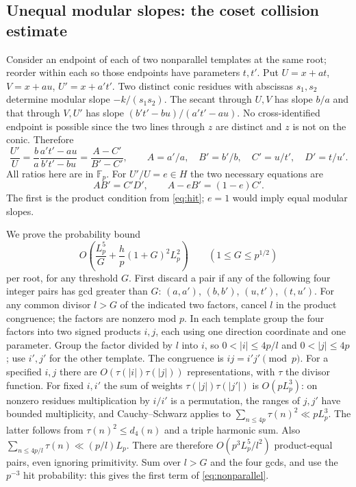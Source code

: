 \documentclass[11pt]{article}
\newcommand{\F}{\mathbb F_p}\newcommand{\G}{\mathcal G}\newcommand{\D}{\mathcal D}\newcommand{\R}{\mathcal R}\newcommand{\Z}{\mathbb Z}\newcommand{\htf}{F_{\mathrm{ht}}}\newcommand{\norm}[1]{\lVert#1\rVert_\infty}\newcommand{\Prob}{\mathbb P}\newcommand{\ch}{\chi}\newcommand{\TT}{\mathcal T}
\begin{document}
\subsection{Unequal modular slopes: the coset collision estimate}
Consider an endpoint of each of two nonparallel templates at the same root; reorder within each so those endpoints have parameters $t,t'$. Put $U=x+at$, $V=x+au$, $U'=x+a't'$. Two distinct conic residues with abscissas $s_1,s_2$ determine modular slope $-k/(s_1s_2)$. The secant through $U,V$ has slope $b/a$ and that through $V,U'$ has slope $(b't'-bu)/(a't'-au)$. No cross-identified endpoint is possible since the two lines through $z$ are distinct and $z$ is not on the conic. Therefore
\[
 \frac{U'}{U}=\frac{b}{a}\frac{a't'-au}{b't'-bu}=\frac{A-C'}{B'-C'},\qquad
 A=a'/a,\quad B'=b'/b,\quad C'=u/t',\quad D'=t/u'.
\]
All ratios here are in $\F$. For $U'/U=e\in H$ the two necessary equations are
\begin{equation}\label{eq:ABCD}
 AB'=C'D',\qquad A-e B'=(1-e)C'.
\end{equation}
The first is the product condition from \eqref{eq:hit}; $e=1$ would imply equal modular slopes.

We prove the probability bound
\begin{equation}\label{eq:nonparallel}
 O\left(\frac{L_p^5}{G}+\frac{h}{p}(1+G)^2 L_p^2\right) \qquad(1\le G\le p^{1/2})
\end{equation}
per root, for any threshold $G$. First discard a pair if any of the following four integer pairs has gcd greater than $G$: $(a,a')$, $(b,b')$, $(u,t')$, $(t,u')$. For any common divisor $l>G$ of the indicated two factors, cancel $l$ in the product congruence; the factors are nonzero mod $p$. In each template group the four factors into two signed products $i,j$, each using one direction coordinate and one parameter. Group the factor divided by $l$ into $i$, so $0<|i|\le4p/l$ and $0<|j|\le4p$; use $i',j'$ for the other template. The congruence is $ij=i'j'\pmod p$. For a specified $i,j$ there are $O(\tau(|i|)\tau(|j|))$ representations, with $\tau$ the divisor function. For fixed $i,i'$ the sum of weights $\tau(|j|)\tau(|j'|)$ is $O(pL_p^3)$: on nonzero residues multiplication by $i/i'$ is a permutation, the ranges of $j,j'$ have bounded multiplicity, and Cauchy--Schwarz applies to $\sum_{n\le4p}\tau(n)^2\ll p L_p^3$. The latter follows from $\tau(n)^2\le d_4(n)$ and a triple harmonic sum. Also $\sum_{n\le4p/l}\tau(n)\ll(p/l)L_p$. There are therefore $O(p^3L_p^5/l^2)$ product-equal pairs, even ignoring primitivity. Sum over $l>G$ and the four gcds, and use the $p^{-3}$ hit probability: this gives the first term of \eqref{eq:nonparallel}.
\end{document}
